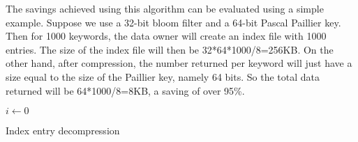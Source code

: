 The savings achieved using this algorithm can be evaluated using a simple example.
Suppose we use a 32-bit bloom filter and a 64-bit Pascal Paillier key.
Then for 1000 keywords, the data owner will create an index file with 1000 entries.
The size of the index file will then be 32*64*1000/8=256KB. On the other hand,
after compression, the number returned per keyword will just have a size equal to the
size of the Paillier key, namely 64 bits. So the total data returned will be
64*1000/8=8KB, a saving of over 95\%.

\begin{algorithm}[ht!]
 $i \gets 0 $\;
\;
 \caption{Index entry decompression}

 \label{algo:decomp}
\end{algorithm}
